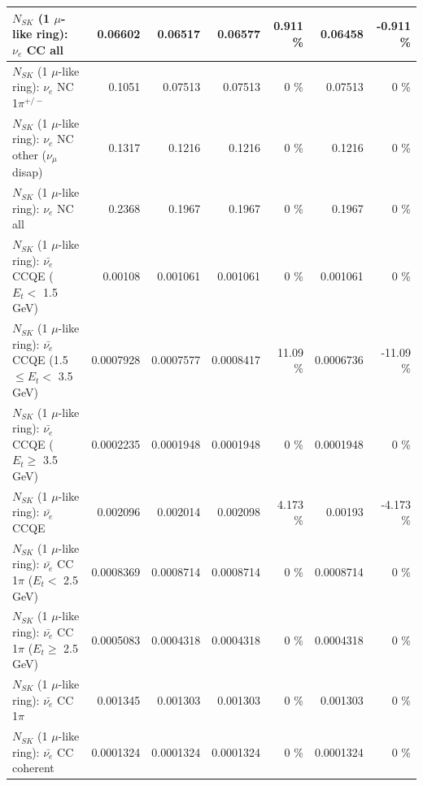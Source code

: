 \begin{table}
\begin{tabular}{| l | r | r | r  r | r  r |}
                                  $N_{SK}$ (1 $\mu$-like ring): $\nu_{e}$ CC all &         0.06602 &         0.06517 &         0.06577 &    0.911 \%  &         0.06458 &   -0.911 \%  \\ 
\hline
                           $N_{SK}$ (1 $\mu$-like ring): $\nu_e$ NC 1$\pi^{+/-}$ &          0.1051 &         0.07513 &         0.07513 &        0 \%  &         0.07513 &        0 \%  \\ 
                $N_{SK}$ (1 $\mu$-like ring): $\nu_e$ NC other ($\nu_\mu$ disap) &          0.1317 &          0.1216 &          0.1216 &        0 \%  &          0.1216 &        0 \%  \\ 
                                  $N_{SK}$ (1 $\mu$-like ring): $\nu_{e}$ NC all &          0.2368 &          0.1967 &          0.1967 &        0 \%  &          0.1967 &        0 \%  \\ 
\hline
\hline
\hline
            $N_{SK}$ (1 $\mu$-like ring): $\bar{\nu_e}$ CCQE ($E_{t} <$ 1.5 GeV) &         0.00108 &        0.001061 &        0.001061 &        0 \%  &        0.001061 &        0 \%  \\ 
   $N_{SK}$ (1 $\mu$-like ring): $\bar{\nu_e}$ CCQE (1.5 $\leq E_{t} <$ 3.5 GeV) &       0.0007928 &       0.0007577 &       0.0008417 &    11.09 \%  &       0.0006736 &   -11.09 \%  \\ 
         $N_{SK}$ (1 $\mu$-like ring): $\bar{\nu_e}$ CCQE ($E_{t} \geq$ 3.5 GeV) &       0.0002235 &       0.0001948 &       0.0001948 &        0 \%  &       0.0001948 &        0 \%  \\ 
\hline
                                $N_{SK}$ (1 $\mu$-like ring): $\bar{\nu_e}$ CCQE &        0.002096 &        0.002014 &        0.002098 &    4.173 \%  &         0.00193 &   -4.173 \%  \\ 
\hline
       $N_{SK}$ (1 $\mu$-like ring): $\bar{\nu_e}$ CC 1$\pi$ ($E_{t} <$ 2.5 GeV) &       0.0008369 &       0.0008714 &       0.0008714 &        0 \%  &       0.0008714 &        0 \%  \\ 
    $N_{SK}$ (1 $\mu$-like ring): $\bar{\nu_e}$ CC 1$\pi$ ($E_{t} \geq$ 2.5 GeV) &       0.0005083 &       0.0004318 &       0.0004318 &        0 \%  &       0.0004318 &        0 \%  \\ 
\hline
                           $N_{SK}$ (1 $\mu$-like ring): $\bar{\nu_e}$ CC 1$\pi$ &        0.001345 &        0.001303 &        0.001303 &        0 \%  &        0.001303 &        0 \%  \\ 
                         $N_{SK}$ (1 $\mu$-like ring): $\bar{\nu_e}$ CC coherent &       0.0001324 &       0.0001324 &       0.0001324 &        0 \%  &       0.0001324 &        0 \%  \\ 

\end{tabular}
\end{table}
